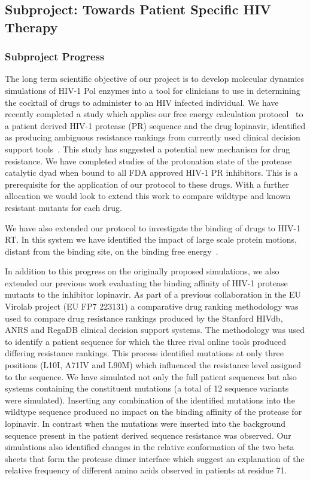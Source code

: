 \documentclass[a4paper,11pt]{article}
\begin{document}
\subsection{Subproject: Towards Patient Specific HIV Therapy}

\subsubsection{Subproject Progress}
The long term scientific objective of our project is to develop molecular dynamics simulations of HIV-1 Pol enzymes into a tool for clinicians to use in determining the cocktail of drugs to administer to an HIV infected individual. We have recently completed a study which applies our free energy calculation protocol~\cite{Ref2} to a patient derived HIV-1 protease (PR) sequence and the drug lopinavir, identified as producing ambiguous resistance rankings from currently used clinical decision support tools~\cite{Ref3}. This study has suggested a potential new mechanism for drug resistance. We have completed studies of the protonation state of the protease catalytic dyad when bound to all FDA approved HIV-1 PR inhibitors. This is a prerequisite for the application of our protocol to these drugs. With a further allocation we would look to extend this work to compare wildtype and known resistant mutants for each drug.

We have also extended our protocol to investigate the binding of drugs to HIV-1 RT. In this system we have identified the impact of large scale protein motions, distant from the binding site, on the binding free energy~\cite{Ref4}.



In addition to this progress on the originally proposed simulations, we also extended our previous work evaluating the binding affinity of HIV-1 protease mutants to the inhibitor lopinavir. As part of a previous collaboration in the EU Virolab project (EU FP7 223131) a comparative drug ranking methodology was used to compare drug resistance rankings produced by the Stanford HIVdb, ANRS and RegaDB clinical decision support systems. The methodology was used to identify a patient sequence for which the three rival online tools produced differing resistance rankings. This process identified mutations at only three positions (L10I, A71IV and L90M) which influenced the resistance level assigned to the sequence. We have simulated not only the full patient sequences but also systems containing the constituent mutations (a total of 12 sequence variants were simulated).  Inserting any combination of the identified mutations into the wildtype sequence produced no impact on the binding affinity of the protease for lopinavir. In contrast when the mutations were inserted into the background sequence present in the patient derived sequence resistance was observed. Our simulations also identified changes in the relative conformation of the two beta sheets that form the protease dimer interface which suggest an explanation of the relative frequency of different amino acids observed in patients at residue 71. 
\end{document}
